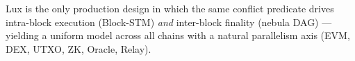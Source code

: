 Lux is the only production design in which the same conflict predicate
drives intra-block execution (Block-STM) \emph{and} inter-block finality
(nebula DAG) — yielding a uniform model across all chains with a natural
parallelism axis (EVM, DEX, UTXO, ZK, Oracle, Relay).

